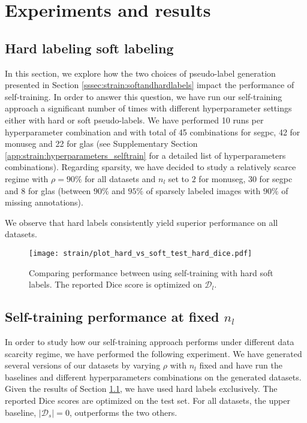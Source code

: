 \section{Experiments and results}
\label{sec:strain:results}

\subsection{Hard labeling \vs soft labeling}
\label{ssec:strain:res:hardvssoft}

In this section, we explore how the two choices of pseudo-label generation presented in Section \ref{sssec:strain:softandhardlabels} impact the performance of self-training. In order to answer this question, we have run our self-training approach a significant number of times with different hyperparameter settings either with hard or soft pseudo-labels. We have performed 10 runs per hyperparameter combination and with total of 45 combinations for \acrshort{segpc}, 42 for \acrshort{monuseg} and 22 for \acrshort{glas} (see Supplementary Section \ref{app:strain:hyperparameters_selftrain} for a detailed list of hyperparameters combinations). Regarding sparsity, we have decided to study a relatively scarce regime with $\rho = 90\%$ for all datasets and $n_l$ set to $2$ for \acrshort{monuseg}, $30$ for \acrshort{segpc} and $8$ for \acrshort{glas} (\ie between $90\%$ and $95\%$ of sparsely labeled images with $90\%$ of missing annotations).    

We observe that hard labels consistently yield superior performance on all datasets. 

\begin{figure}
  \centering
  \texttt{[image: strain/plot\_hard\_vs\_soft\_test\_hard\_dice.pdf]}
  \caption{Comparing performance between using self-training with hard \vs soft labels. The reported Dice score is optimized on $\mathcal{D}_l$.}
  \label{fig:strain:hard_vs_soft}
\end{figure}

\subsection{Self-training performance at fixed $n_l$}
\label{ssec:strain:fixednl}

In order to study how our self-training approach performs under different data scarcity regime, we have performed the following experiment. We have generated several versions of our datasets by varying $\rho$ with $n_l$ fixed and have run the baselines and different hyperparameters combinations on the generated datasets. Given the results of Section \ref{ssec:strain:res:hardvssoft}, we have used hard labels exclusively. The reported Dice scores are optimized on the test set. For all datasets, the upper baseline, $|\mathcal{D}_s| = 0$, outperforms the two others. 

